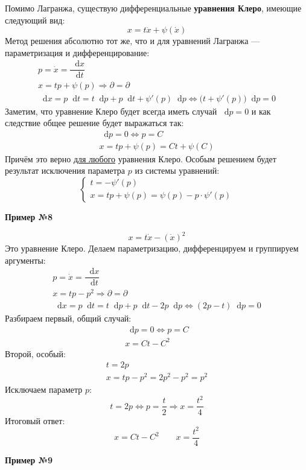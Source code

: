 \documentclass[a4paper,12pt]{article}
\renewcommand*\d{\mathop{}\!\mathrm{d}}
\newcommand{\dx}{\dot{x}}
\newcommand{\bto}{\Longrightarrow}
\begin{document}
Помимо Лагранжа, существую дифференциальные \textbf{уравнения Клеро}, имеющие следующий вид:
\[x = t\dx + \psi(\dx)\]
Метод решения абсолютно тот же, что и для уравнений Лагранжа --- параметризация и дифференцирование:
\begin{gather*}
	p = \dx = \dfrac{\d x}{\d t}\\
	x = tp + \psi(p) \bto \partial = \partial\\
	\d x = p\d t = t \d p + p\d t + \psi'(p)\d p \iff \big(t + \psi'(p)\big)\d p = 0
\end{gather*}
Заметим, что уравнение Клеро будет всегда иметь случай $\d p = 0$ и как следствие общее решение будет выражаться так:
\begin{gather*}
	\d p = 0 \iff p = C\\
	x = tp + \psi(p) = Ct + \psi(C)
\end{gather*}
Причём это верно \underline{для любого} уравнения Клеро. Особым решением будет результат исключения параметра $p$ из системы уравнений:
\[\begin{cases}
	t = -\psi'(p)\\
	x = tp + \psi(p) = \psi(p) - p\cdot \psi'(p)
\end{cases}\]

\textbf{Пример №8}

\[x = t\dx - (\dx)^2\]
Это уравнение Клеро. Делаем параметризацию, дифференцируем и группируем аргументы:
\begin{gather*}
	p = \dx = \dfrac{\d x}{\d t}\\
	x = tp - p^2 \bto \partial = \partial\\
	\d x = p\d t = t\d p + p\d t - 2p\d p \iff (2p - t)\d p = 0
\end{gather*}
Разбираем первый, общий случай:
\begin{gather*}
	\d p = 0 \iff p = C\\
	x = Ct - C^2
\end{gather*}
Второй, особый:
\begin{gather*}
	t = 2p\\
	x = tp - p^2 = 2p^2 - p^2 = p^2
\end{gather*}
Исключаем параметр $p$:
\[t = 2p \iff p = \dfrac{t}{2} \bto x = \dfrac{t^2}{4}\]
Итоговый ответ:
\[x = Ct - C^2 \qquad x = \dfrac{t^2}{4}\]

\textbf{Пример №9}
\end{document}
